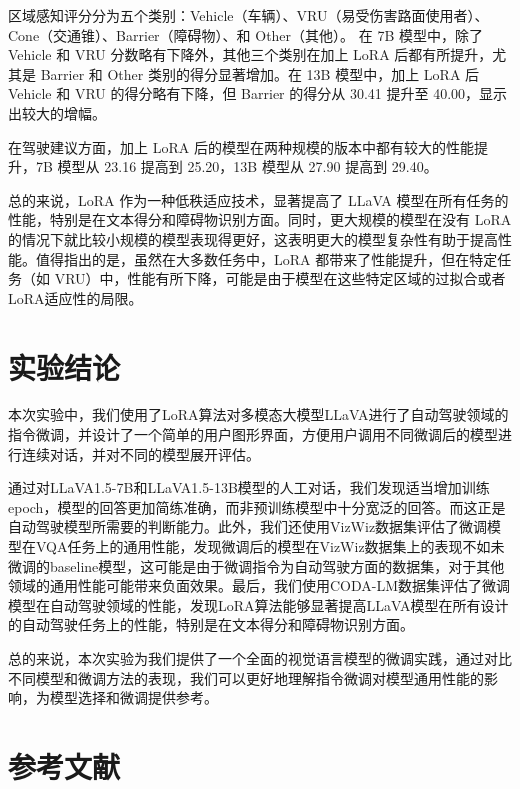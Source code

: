 \documentclass[
    linespread = 1.25
]{ctexart}
\begin{document}
区域感知评分分为五个类别：Vehicle（车辆）、VRU（易受伤害路面使用者）、Cone（交通锥）、Barrier（障碍物）、和 Other（其他）。
在 7B 模型中，除了 Vehicle 和 VRU 分数略有下降外，其他三个类别在加上 LoRA 后都有所提升，尤其是 Barrier 和 Other 类别的得分显著增加。在 13B 模型中，加上 LoRA 后 Vehicle 和 VRU 的得分略有下降，但 Barrier 的得分从 30.41 提升至 40.00，显示出较大的增幅。

在驾驶建议方面，加上 LoRA 后的模型在两种规模的版本中都有较大的性能提升，7B 模型从 23.16 提高到 25.20，13B 模型从 27.90 提高到 29.40。

总的来说，LoRA 作为一种低秩适应技术，显著提高了 LLaVA 模型在所有任务的性能，特别是在文本得分和障碍物识别方面。同时，更大规模的模型在没有 LoRA 的情况下就比较小规模的模型表现得更好，这表明更大的模型复杂性有助于提高性能。值得指出的是，虽然在大多数任务中，LoRA 都带来了性能提升，但在特定任务（如 VRU）中，性能有所下降，可能是由于模型在这些特定区域的过拟合或者LoRA适应性的局限。




\section{实验结论}
本次实验中，我们使用了LoRA算法对多模态大模型LLaVA进行了自动驾驶领域的指令微调，并设计了一个简单的用户图形界面，方便用户调用不同微调后的模型进行连续对话，并对不同的模型展开评估。

通过对LLaVA1.5-7B和LLaVA1.5-13B模型的人工对话，我们发现适当增加训练 epoch，模型的回答更加简练准确，而非预训练模型中十分宽泛的回答。而这正是自动驾驶模型所需要的判断能力。此外，我们还使用VizWiz数据集评估了微调模型在VQA任务上的通用性能，发现微调后的模型在VizWiz数据集上的表现不如未微调的baseline模型，这可能是由于微调指令为自动驾驶方面的数据集，对于其他领域的通用性能可能带来负面效果。最后，我们使用CODA-LM数据集评估了微调模型在自动驾驶领域的性能，发现LoRA算法能够显著提高LLaVA模型在所有设计的自动驾驶任务上的性能，特别是在文本得分和障碍物识别方面。

总的来说，本次实验为我们提供了一个全面的视觉语言模型的微调实践，通过对比不同模型和微调方法的表现，我们可以更好地理解指令微调对模型通用性能的影响，为模型选择和微调提供参考。



\appendix

\newpage
\section*{参考文献}
\printbibliography[heading=none]
\end{document}
